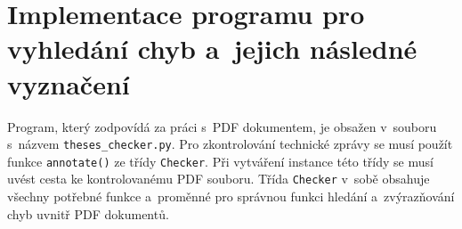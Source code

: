 \section{Implementace programu pro vyhledání chyb a~jejich následné vyznačení} \label{checker}
Program, který zodpovídá za práci s~PDF dokumentem, je obsažen v~souboru s~názvem
\texttt{theses\_checker.py}. Pro zkontrolování technické zprávy se musí použít
funkce \texttt{annotate()} ze třídy \texttt{Checker}. Při vytváření instance této
třídy se musí uvést cesta ke kontrolovanému PDF souboru. Třída \texttt{Checker}
v~sobě obsahuje všechny potřebné funkce a~proměnné pro správnou funkci hledání
a~zvýrazňování chyb uvnitř PDF dokumentů.

